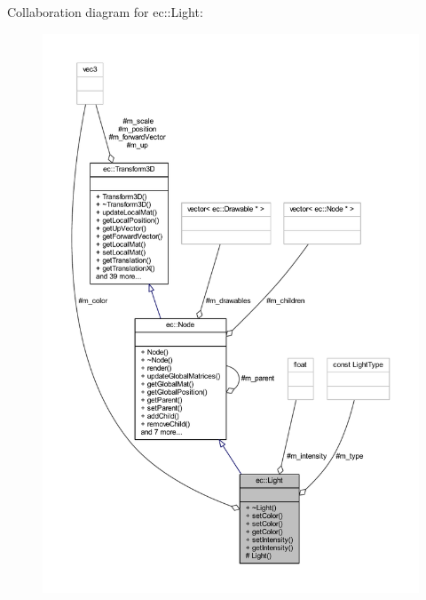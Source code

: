Collaboration diagram for ec\+:\+:Light\+:\nopagebreak
\begin{figure}[H]
\begin{center}
\leavevmode
\includegraphics[width=350pt]{classec_1_1_light__coll__graph}
\end{center}
\end{figure}
